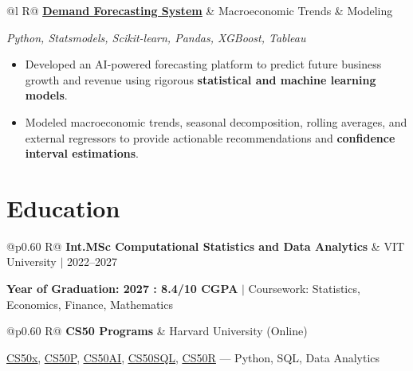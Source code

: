 \documentclass[a4paper,10pt]{article}
\newcommand{\ulink}[2]{\href{#1}{\uline{#2}}}
\newcommand{\subheading}[1]{{\color[HTML]{0A0A0A}\fontsize{12}{14}\selectfont\bfseries #1}}
\newcommand{\techstack}[1]{{\color[HTML]{5C5C5C}\fontsize{10.5}{12.5}\selectfont\itshape #1}}
\newcommand{\meta}[1]{{\color[HTML]{5C5C5C}\fontsize{10.5}{12.5}\selectfont #1}}
\begin{document}
\begin{tabularx}{\linewidth}{@{}l R@{}}
\subheading{\ulink{https://github.com/su-jin1425/Demand-Forecasting-System}{Demand Forecasting System}} & \meta{Macroeconomic Trends \& Modeling}
\end{tabularx}

\techstack{Python, Statsmodels, Scikit-learn, Pandas, XGBoost, Tableau}
\begin{itemize}[nosep, leftmargin=1.5em, itemsep=0pt, topsep=0pt]
  \item {\color[HTML]{0A0A0A}\fontsize{11}{14}\selectfont Developed an AI-powered forecasting platform to predict future business growth and revenue using rigorous \textbf{statistical and machine learning models}.}
  \item {\color[HTML]{0A0A0A}\fontsize{11}{14}\selectfont Modeled macroeconomic trends, seasonal decomposition, rolling averages, and external regressors to provide actionable recommendations and \textbf{confidence interval estimations}.}
\end{itemize}



\section{Education}


\begin{tabularx}{\linewidth}{@{}p{0.60\linewidth} R@{}}
\subheading{Int.MSc Computational Statistics and Data Analytics} & \meta{VIT University $|$ 2022--2027}
\end{tabularx}

{\color[HTML]{3A3A3A}\fontsize{11}{14}\selectfont \textbf{Year of Graduation: 2027 : 8.4/10 CGPA} $|$ Coursework: Statistics, Economics, Finance, Mathematics}

\begin{tabularx}{\linewidth}{@{}p{0.60\linewidth} R@{}}
\subheading{CS50 Programs} & \meta{Harvard University (Online)}
\end{tabularx}

{\color[HTML]{3A3A3A}\fontsize{11}{14}\selectfont \ulink{https://cs50.harvard.edu/certificates/b14b78df-e05c-413e-a607-1dd27303053a}{CS50x}, \ulink{https://cs50.harvard.edu/certificates/32477052-9db4-49c4-a5a4-d7e58429ca2c}{CS50P}, \ulink{https://cs50.harvard.edu/certificates/9cdb4d4a-1250-4f8e-9fd7-191864e0f919}{CS50AI}, \ulink{https://cs50.harvard.edu/certificates/bc486f24-f085-4e61-8536-80940b97a1b9}{CS50SQL}, \ulink{https://cs50.harvard.edu/certificates/666838e6-a053-4d82-b179-a60fe745fd84}{CS50R} --- Python, SQL, Data Analytics}
\end{document}
